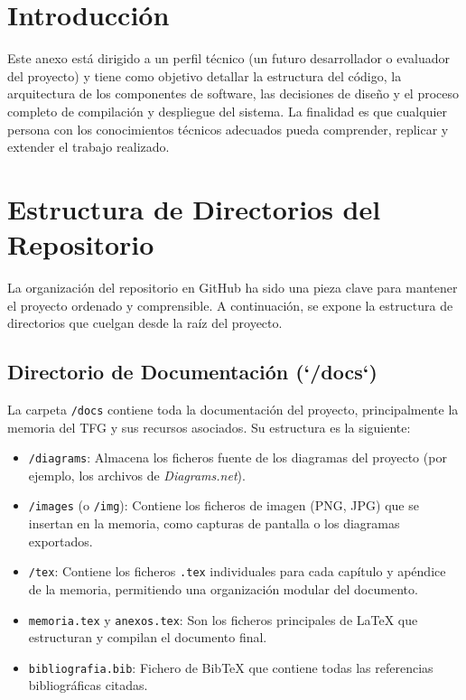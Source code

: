 \label{apendice:doc_tecnica}


\section{Introducción}
Este anexo está dirigido a un perfil técnico (un futuro desarrollador o evaluador del proyecto) y tiene como objetivo detallar la estructura del código, la arquitectura de los componentes de software, las decisiones de diseño y el proceso completo de compilación y despliegue del sistema. La finalidad es que cualquier persona con los conocimientos técnicos adecuados pueda comprender, replicar y extender el trabajo realizado.

\section{Estructura de Directorios del Repositorio}
\label{sec:doc_tecnica_directorios}
La organización del repositorio en GitHub ha sido una pieza clave para mantener el proyecto ordenado y comprensible. A continuación, se expone la estructura de directorios que cuelgan desde la raíz del proyecto.

\subsection{Directorio de Documentación (`/docs`)}
La carpeta \texttt{/docs} contiene toda la documentación del proyecto, principalmente la memoria del TFG y sus recursos asociados. Su estructura es la siguiente:


\begin{itemize}
    \item \texttt{/diagrams}: Almacena los ficheros fuente de los diagramas del proyecto (por ejemplo, los archivos de \textit{Diagrams.net}).
    \item \texttt{/images} (o \texttt{/img}): Contiene los ficheros de imagen (PNG, JPG) que se insertan en la memoria, como capturas de pantalla o los diagramas exportados.
    \item \texttt{/tex}: Contiene los ficheros \texttt{.tex} individuales para cada capítulo y apéndice de la memoria, permitiendo una organización modular del documento.
    \item \texttt{memoria.tex} y \texttt{anexos.tex}: Son los ficheros principales de \LaTeX{} que estructuran y compilan el documento final.
    \item \texttt{bibliografia.bib}: Fichero de BibTeX que contiene todas las referencias bibliográficas citadas.
\end{itemize}

